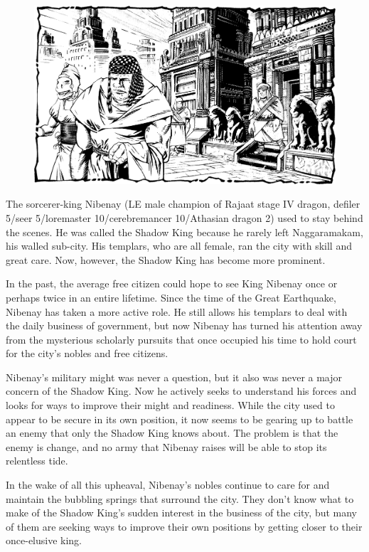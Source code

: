 {
\begin{figure}[b!]
\centering
\includegraphics[width=\textwidth]{images/nibenay-2.png}
\WOTC
\end{figure}

	The sorcerer-king Nibenay (LE male champion of Rajaat stage IV dragon, defiler 5/seer 5/loremaster 10/cerebremancer 10/Athasian dragon 2) used to stay behind the scenes. He was called the Shadow King because he rarely left Naggaramakam, his walled sub-city. His templars, who are all female, ran the city with skill and great care. Now, however, the Shadow King has become more prominent.

	In the past, the average free citizen could hope to see King Nibenay once or perhaps twice in an entire lifetime. Since the time of the Great Earthquake, Nibenay has taken a more active role. He still allows his templars to deal with the daily business of government, but now Nibenay has turned his attention away from the mysterious scholarly pursuits that once occupied his time to hold court for the city's nobles and free citizens.

	Nibenay's military might was never a question, but it also was never a major concern of the Shadow King. Now he actively seeks to understand his forces and looks for ways to improve their might and readiness. While the city used to appear to be secure in its own position, it now seems to be gearing up to battle an enemy that only the Shadow King knows about. The problem is that the enemy is change, and no army that Nibenay raises will be able to stop its relentless tide.

	In the wake of all this upheaval, Nibenay's nobles continue to care for and maintain the bubbling springs that surround the city. They don't know what to make of the Shadow King's sudden interest in the business of the city, but many of them are seeking ways to improve their own positions by getting closer to their once-elusive king.
}

